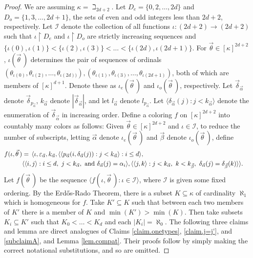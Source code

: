 \documentclass{amsart}
\theoremstyle{remark}
\theoremstyle{definition}
\theoremstyle{remark}
\newcommand{\al}{\alpha}
\newcommand{\sse}{\subseteq}
\newcommand{\re}{\restriction}
\newcommand{\ra}{\rightarrow}
\newcommand{\lgl}{\langle}
\newcommand{\rgl}{\rangle}
\newcommand{\Erdos}{Erd{\H{o}}s}
\begin{document}
\begin{proof}
We are assuming $\kappa=\beth_{2d+2}$.
Let $D_e=\{0,2,\dots,2d\}$ and  $D_o=\{1,3,\dots,2d+1\}$, the sets of  even and odd integers less than $2d+2$, respectively.
Let $\mathcal{I}$ denote the collection of all functions $\iota: (2d+2)\ra (2d+2)$ such that
$\iota\re D_e$
and $\iota\re D_o$ are strictly  increasing sequences
and $\{\iota(0),\iota(1)\}<\{\iota(2),\iota(3)\}<\dots<\{\iota(2d),\iota(2d+1)\}$.
For $\vec{\theta}\in[\kappa]^{2d+2}$,
$\iota(\vec{\theta}\,)$ determines the pair of sequences of ordinals $(\theta_{\iota(0)},\theta_{\iota(2)},\dots,\theta_{\iota(2d))}), (\theta_{\iota(1)},\theta_{\iota(3)},\dots,\theta_{\iota(2d+1)})$,
both of which are members of $[\kappa]^{d+1}$.
Denote these as $\iota_e(\vec\theta\,)$ and $\iota_o(\vec\theta\,)$, respectively.
Let $\vec{\delta}_{\vec\al}$ denote $\vec\delta_{p_{\vec\al}}$,
 $k_{\vec{\al}}$ denote $|\vec{\delta}_{\vec\al}|$,
and let $l_{\vec{\al}}$ denote  $l_{p_{\vec\al}}$.
Let $\lgl \delta_{\vec{\al}}(j):j<k_{\vec{\al}}\rgl$
denote the enumeration of $\vec{\delta}_{\vec\al}$
in increasing order.
Define a coloring  $f$ on $[\kappa]^{2d+2}$ into countably many colors as follows:
Given  $\vec\theta\in[\kappa]^{2d+2}$ and
 $\iota\in\mathcal{I}$, to reduce the number of subscripts,  letting
$\vec\al$ denote $\iota_e(\vec\theta\,)$ and $\vec\beta$ denote $\iota_o(\vec\theta\,)$,
define
\begin{align}\label{eq.fiotatheta(c)}
f(\iota,\vec\theta\,)&= \,
\lgl \iota, \varepsilon_{\vec{\al}}, k_{\vec{\al}},
\lgl \lgl p_{\vec{\al}}(i,\delta_{\vec{\al}}(j)):j<k_{\vec{\al}}\rgl:i\le d\rgl,\cr
& \lgl  \lgl i,j \rgl: i\le d,\ j<k_{\vec{\al}},\ \mathrm{and\ } \delta_{\vec{\al}}(j)=\al_i \rgl,
\lgl \lgl j,k\rgl:j<k_{\vec{\al}},\ k<k_{\vec{\beta}},\ \delta_{\vec{\al}}(j)=\delta_{\vec{\beta}}(k)\rgl\rgl.
\end{align}
Let $f(\vec{\theta}\,)$ be the sequence $\lgl f(\iota,\vec\theta\,):\iota\in\mathcal{I}\rgl$, where $\mathcal{I}$ is given some fixed ordering.
By the \Erdos-Rado Theorem,
there is a subset $K\sse\kappa$ of cardinality $\aleph_1$
which is homogeneous for $f$.
Take $K'\sse K$ such that between each two members of $K'$ there is a member of $K$ and $\min(K')>\min(K)$.
Then take subsets $K_i\sse K'$ such that  $K_0<\dots<K_{d}$
and   each $|K_i|=\aleph_0$.
The following three claims and lemma are direct analogues of
Claims \ref{claim.onetypes}, \ref{claim.j=j'},  and \ref{subclaimA}, and Lemma \ref{lem.compat}.
Their proofs follow by simply making the correct notational substitutions, and so are omitted.






\end{proof}
\end{document}
